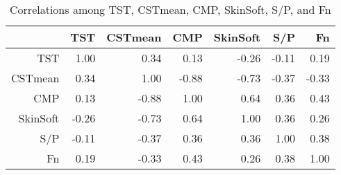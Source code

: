 \begin{table}[ht]
\centering
\caption{Correlations among TST, CSTmean, CMP, SkinSoft, S/P, and Fn}
\label{tab:collfollcor}
\begin{tabular}{|rrrrrrr|}
  \hline
 & TST & CSTmean & CMP & SkinSoft & S/P & Fn \\ 
  \hline
TST & 1.00 & 0.34 & 0.13 & -0.26 & -0.11 & 0.19 \\ 
  CSTmean & 0.34 & 1.00 & -0.88 & -0.73 & -0.37 & -0.33 \\ 
  CMP & 0.13 & -0.88 & 1.00 & 0.64 & 0.36 & 0.43 \\ 
  SkinSoft & -0.26 & -0.73 & 0.64 & 1.00 & 0.36 & 0.26 \\ 
  S/P & -0.11 & -0.37 & 0.36 & 0.36 & 1.00 & 0.38 \\ 
  Fn & 0.19 & -0.33 & 0.43 & 0.26 & 0.38 & 1.00 \\ 
   \hline
\end{tabular}
\end{table}

